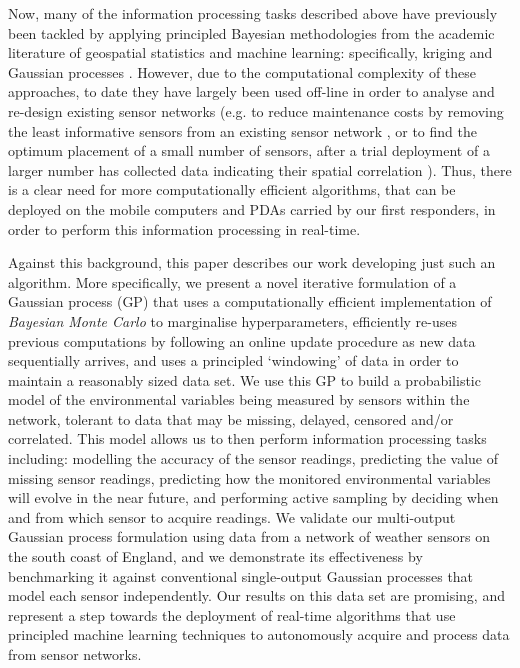 \documentclass{acmtrans2m}
\begin{document}
Now, many of the information processing tasks described above have previously been tackled by applying principled Bayesian methodologies from the academic literature of geospatial statistics and machine learning: specifically, kriging \cite{cressie} and Gaussian processes \cite{GPsBook}. However, due to the computational complexity of these approaches, to date they have largely been used off-line in order to analyse and re-design existing sensor networks (e.g. to reduce maintenance costs by removing the least informative sensors from an existing sensor network \cite{fuentes}, or to find the optimum placement of a small number of sensors, after a trial deployment of a larger number has collected data indicating their spatial correlation \cite{guestrin1}). Thus, there is a clear need for more computationally efficient algorithms, that can be deployed on the mobile computers and PDAs carried by our first responders, in order to perform this information processing in real-time.

Against this background, this paper describes our work developing just such an algorithm. More specifically, we present a novel iterative formulation of a Gaussian process (GP) that uses a computationally efficient implementation of {\em Bayesian Monte Carlo} to marginalise hyperparameters, efficiently re-uses previous computations by following an online update procedure as new data sequentially arrives, and uses a principled `windowing' of data in order to maintain a reasonably sized data set. We use this GP to build a probabilistic model of the environmental variables being measured by sensors within the network, tolerant to data that may be missing, delayed, censored and/or correlated. This model allows us to then perform information processing tasks including: modelling the accuracy of the sensor readings, predicting the value of missing sensor readings, predicting how the monitored environmental variables will evolve in the near future, and performing active sampling by deciding when and from which sensor to acquire readings. We validate our multi-output Gaussian process formulation using data from a network of weather sensors on the south coast of England, and we demonstrate its effectiveness by benchmarking it against conventional single-output Gaussian processes that model each sensor independently. Our results on this data set are promising, and represent a step towards the deployment of real-time algorithms that use principled machine learning techniques to autonomously acquire and process data from sensor networks.
\end{document}
